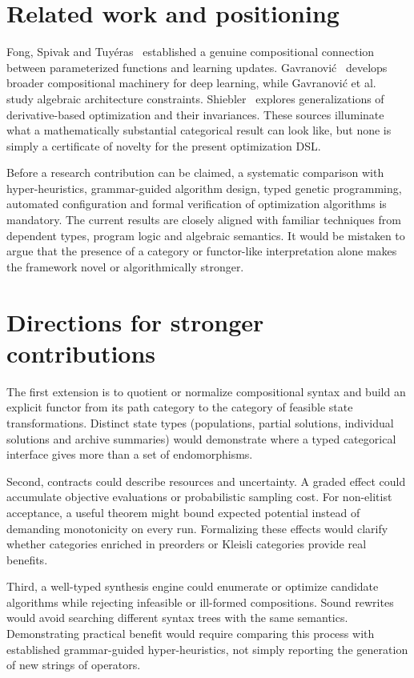 \documentclass[11pt,a4paper]{article}
\begin{document}
\section{Related work and positioning}
Fong, Spivak and Tuy\'eras~\cite{fong2019backprop} established a genuine
compositional connection between parameterized functions and learning
updates. Gavranovi\'c~\cite{gavranovic2024fundamental} develops broader
compositional machinery for deep learning, while
Gavranovi\'c et al.~\cite{gavranovic2024architectures} study algebraic
architecture constraints. Shiebler~\cite{shiebler2021generalized}
explores generalizations of derivative-based optimization and their
invariances. These sources illuminate what a mathematically substantial
categorical result can look like, but none is simply a certificate of novelty
for the present optimization DSL.

Before a research contribution can be claimed, a systematic comparison with
hyper-heuristics, grammar-guided algorithm design, typed genetic programming,
automated configuration and formal verification of optimization algorithms
is mandatory. The current results are closely aligned with familiar
techniques from dependent types, program logic and algebraic semantics.
It would be mistaken to argue that the presence of a category or functor-like
interpretation alone makes the framework novel or algorithmically stronger.

\section{Directions for stronger contributions}
The first extension is to quotient or normalize compositional syntax and
build an explicit functor from its path category to the category of feasible
state transformations. Distinct state types (populations, partial solutions,
individual solutions and archive summaries) would demonstrate where a typed
categorical interface gives more than a set of endomorphisms.

Second, contracts could describe resources and uncertainty. A graded effect
could accumulate objective evaluations or probabilistic sampling cost.
For non-elitist acceptance, a useful theorem might bound expected potential
instead of demanding monotonicity on every run. Formalizing these effects
would clarify whether categories enriched in preorders or Kleisli categories
provide real benefits.

Third, a well-typed synthesis engine could enumerate or optimize candidate
algorithms while rejecting infeasible or ill-formed compositions. Sound
rewrites would avoid searching different syntax trees with the same
semantics. Demonstrating practical benefit would require comparing this
process with established grammar-guided hyper-heuristics, not simply
reporting the generation of new strings of operators.
\end{document}
